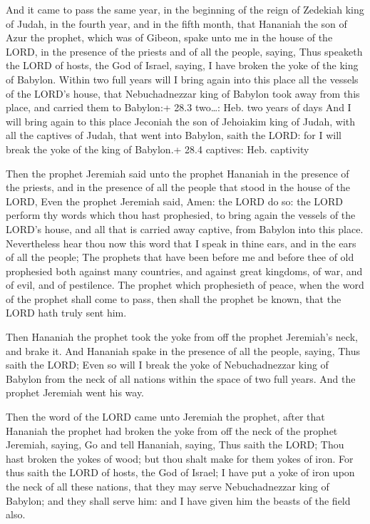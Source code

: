  And it came to pass the same year, in the beginning of the
reign of Zedekiah king of Judah, in the fourth year, and in the fifth
month, that Hananiah the son of Azur the prophet, which was of Gibeon,
spake unto me in the house of the LORD, in the presence of the priests
and of all the people, saying,  Thus speaketh the LORD of
hosts, the God of Israel, saying, I have broken the yoke of the king of
Babylon.  Within two full years will I bring again into this
place all the vessels of the LORD's house, that Nebuchadnezzar king of
Babylon took away from this place, and carried them to Babylon:+ 28.3
two\ldots: Heb. two years of days  And I will bring again to
this place Jeconiah the son of Jehoiakim king of Judah, with all the
captives of Judah, that went into Babylon, saith the LORD: for I will
break the yoke of the king of Babylon.+ 28.4 captives: Heb. captivity

 Then the prophet Jeremiah said unto the prophet Hananiah
in the presence of the priests, and in the presence of all the people
that stood in the house of the LORD,  Even the prophet
Jeremiah said, Amen: the LORD do so: the LORD perform thy words which
thou hast prophesied, to bring again the vessels of the LORD's house,
and all that is carried away captive, from Babylon into this place.
 Nevertheless hear thou now this word that I speak in thine
ears, and in the ears of all the people;  The prophets that
have been before me and before thee of old prophesied both against many
countries, and against great kingdoms, of war, and of evil, and of
pestilence.  The prophet which prophesieth of peace, when
the word of the prophet shall come to pass, then shall the prophet be
known, that the LORD hath truly sent him.

 Then Hananiah the prophet took the yoke from off the
prophet Jeremiah's neck, and brake it.  And Hananiah spake
in the presence of all the people, saying, Thus saith the LORD; Even so
will I break the yoke of Nebuchadnezzar king of Babylon from the neck of
all nations within the space of two full years. And the prophet Jeremiah
went his way.

 Then the word of the LORD came unto Jeremiah the
prophet, after that Hananiah the prophet had broken the yoke from off
the neck of the prophet Jeremiah, saying,  Go and tell
Hananiah, saying, Thus saith the LORD; Thou hast broken the yokes of
wood; but thou shalt make for them yokes of iron.  For thus
saith the LORD of hosts, the God of Israel; I have put a yoke of iron
upon the neck of all these nations, that they may serve Nebuchadnezzar
king of Babylon; and they shall serve him: and I have given him the
beasts of the field also.

